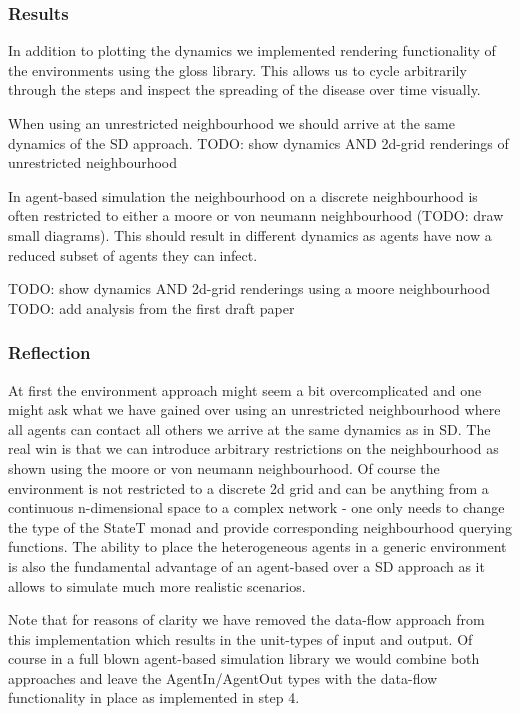 \subsubsection{Results}
In addition to plotting the dynamics we implemented rendering functionality of the environments using the gloss library. This allows us to cycle arbitrarily through the steps and inspect the spreading of the disease over time visually.

When using an unrestricted neighbourhood we should arrive at the same dynamics of the SD approach.
TODO: show dynamics AND 2d-grid renderings of unrestricted neighbourhood

In agent-based simulation the neighbourhood on a discrete neighbourhood is often restricted to either a moore or von neumann neighbourhood (TODO: draw small diagrams). This should result in different dynamics as agents have now a reduced subset of agents they can infect.

TODO: show dynamics AND 2d-grid renderings using a moore neighbourhood
TODO: add analysis from the first draft paper

\subsubsection{Reflection}
At first the environment approach might seem a bit overcomplicated and one might ask what we have gained over using an unrestricted neighbourhood where all agents can contact all others we arrive at the same dynamics as in SD. The real win is that we can introduce arbitrary restrictions on the neighbourhood as shown using the moore or von neumann neighbourhood. 
Of course the environment is not restricted to a discrete 2d grid and can be anything from a continuous n-dimensional space to a complex network - one only needs to change the type of the StateT monad and provide corresponding neighbourhood querying functions. The ability to place the heterogeneous agents in a generic environment is also the fundamental advantage of an agent-based over a SD approach as it allows to simulate much more realistic scenarios.

Note that for reasons of clarity we have removed the data-flow approach from this implementation which results in the unit-types of input and output. Of course in a full blown agent-based simulation library we would combine both approaches and leave the AgentIn/AgentOut types with the data-flow functionality in place as implemented in step 4.

